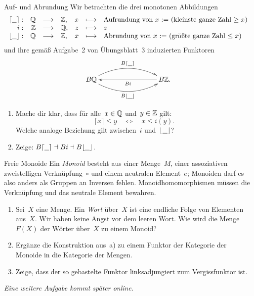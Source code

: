 \documentclass{pizzablatt}
\begin{document}

\begin{aufgabe}{Auf- und Abrundung}
Wir betrachten die drei monotonen Abbildungen
\[ \begin{array}{@{}rrclrcl@{}}
  \lceil\freist\rceil: & \QQ &\longrightarrow& \ZZ, &
  x &\longmapsto& \text{Aufrundung von~$x$ := (kleinste ganze Zahl~$\geq x$)} \\
  i: & \ZZ &\longrightarrow& \QQ, &
  z &\longmapsto& z \\
  \lfloor\freist\rfloor: & \QQ &\longrightarrow& \ZZ, &
  x &\longmapsto& \text{Abrundung von~$x$ := (größte ganze Zahl~$\leq x$)}
\end{array} \]
und ihre gemäß Aufgabe~2 von Übungsblatt~3 induzierten Funktoren
\[ \xymatrixcolsep{7pc}\xymatrix{
  B\QQ
    \ar@/^1.4pc/[r]^{B\lceil\freist\rceil}
    \ar@/_1.4pc/[r]_{B\lfloor\freist\rfloor}
  & B\ZZ. \ar[l]^{Bi}
} \]
\begin{enumerate}
\item Mache dir klar, dass für alle~$x \in \mathbb{Q}$ und~$y \in \mathbb{Z}$ gilt:
\[ \lceil x \rceil \leq y \quad\Longleftrightarrow\quad
  x \leq i(y). \]
Welche analoge Beziehung gilt zwischen~$i$ und~$\lfloor\underline{\ \ }\rfloor$?
\item Zeige: $B\lceil\underline{\ \ }\rceil \dashv Bi \dashv B\lfloor\underline{\ \ }\rfloor$.
\end{enumerate}
\end{aufgabe}

\begin{aufgabe}{Freie Monoide}
Ein \emph{Monoid} besteht aus einer Menge~$M$, einer assoziativen
zweistelligen Verknüpfung~$\circ$ und einem neutralen Element~$e$; Monoiden
darf es also anders als Gruppen an Inversen fehlen. Monoidhomomorphismen müssen
die Verknüpfung und das neutrale Element bewahren.
\begin{enumerate}
\item
Sei~$X$ eine Menge. Ein \emph{Wort} über~$X$ ist eine endliche Folge von
Elementen aus~$X$. Wir haben keine Angst vor dem leeren Wort. Wie wird die
Menge~$F(X)$ der Wörter über~$X$ zu einem Monoid?
\item Ergänze die Konstruktion aus~a) zu einem Funktor der Kategorie der
Monoide in die Kategorie der Mengen.
\item Zeige, dass der so gebastelte Funktor linksadjungiert zum Vergissfunktor
ist.
\end{enumerate}
\end{aufgabe}

\emph{Eine weitere Aufgabe kommt später online.}

\end{document}
